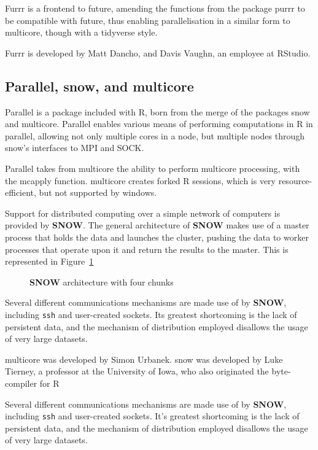 Furrr is a frontend to future, amending the functions from the package
purrr to be compatible with future, thus enabling parallelisation in a
similar form to multicore, though with a tidyverse
style\cite{vaughan18}.

Furrr is developed by Matt Dancho, and Davis Vaughn, an employee at
RStudio.

\hypertarget{sec:parall-snow-mult}{%
    \subsection{Parallel, snow, and multicore}\label{sec:parall-snow-mult}}

Parallel is a package included with R, born from the merge of the
packages snow and multicore\cite{core:_packag}. Parallel enables
various means of performing computations in R in parallel, allowing not
only multiple cores in a node, but multiple nodes through snow's
interfaces to MPI and SOCK\cite{tierney18}.

Parallel takes from multicore the ability to perform multicore
processing, with the mcapply function. multicore creates forked R
sessions, which is very resource-efficient, but not supported by
windows.

Support for distributed computing over a simple network of computers is provided by \textbf{SNOW}.
The general architecture of \textbf{SNOW} makes use of a master process that holds the data and launches the cluster, pushing the data to worker processes that operate upon it and return the results to the master.
This is represented in Figure~\ref{fig:snow}

\begin{figure}[H]

\caption{\label{fig:snow} \textbf{SNOW} architecture with four chunks}
\end{figure}

Several different communications mechanisms are made use of by \textbf{SNOW}, including \texttt{ssh} and user-created sockets.
Its greatest shortcoming is the lack of persistent data, and the mechanism of distribution employed disallows the usage of very large datasets.

multicore was developed by Simon Urbanek. snow was developed by Luke
Tierney, a professor at the University of Iowa, who also originated the
byte-compiler for R

Several different communications mechanisms are made use of by \textbf{SNOW}, including \texttt{ssh} and user-created sockets.
It's greatest shortcoming is the lack of persistent data, and the mechanism of distribution employed disallows the usage of very large datasets.

